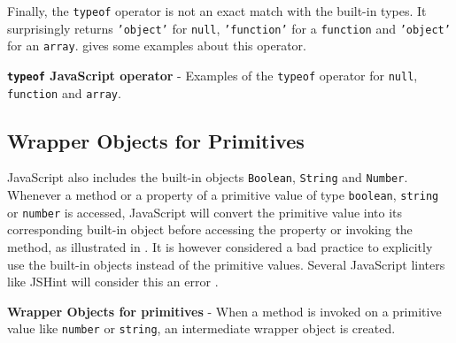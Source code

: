Finally, the \texttt{typeof} operator is not an exact match with the built-in types. It surprisingly returns \texttt{'object'} for \texttt{null}, \texttt{'function'} for a \texttt{function} and \texttt{'object'} for an \texttt{array}.  gives some examples about this operator.

\begin{code}
	\captionsetup{aboveskip=0pt, belowskip=10pt}
	\caption[typeof JavaScript operator]{\textbf{\texttt{typeof} JavaScript operator} - Examples of the \texttt{typeof} operator for \texttt{null}, \texttt{function} and \texttt{array}.}
	\label{code:background-javascript-typeof}
\end{code}

\subsection{Wrapper Objects for Primitives}
JavaScript also includes the built-in objects \texttt{Boolean}, \texttt{String} and \texttt{Number}. Whenever a method or a property of a primitive value of type \texttt{boolean}, \texttt{string} or \texttt{number} is accessed, JavaScript will convert the primitive value into its corresponding built-in object before accessing the property or invoking the method, as illustrated in . It is however considered a bad practice to explicitly use the built-in objects instead of the primitive values. Several JavaScript linters like JSHint will consider this an error \citep{jshint-wrapper-objects-error}.

\begin{code}
	\captionsetup{aboveskip=0pt, belowskip=10pt}
	\caption[Wrapper Objects for primitives]{\textbf{Wrapper Objects for primitives} - When a method is invoked on a primitive value like \texttt{number} or \texttt{string}, an intermediate wrapper object is created.}
	\label{code:background-javascript-wrapper-objects}
\end{code}

